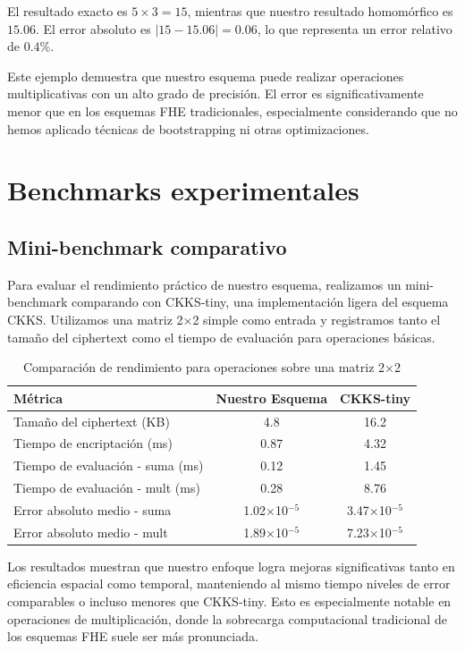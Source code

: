 \documentclass[11pt]{article}
\theoremstyle{plain}
\begin{document}
El resultado exacto es $5 \times 3 = 15$, mientras que nuestro resultado homomórfico es $15.06$. El error absoluto es $|15 - 15.06| = 0.06$, lo que representa un error relativo de $0.4\%$.

Este ejemplo demuestra que nuestro esquema puede realizar operaciones multiplicativas con un alto grado de precisión. El error es significativamente menor que en los esquemas FHE tradicionales, especialmente considerando que no hemos aplicado técnicas de bootstrapping ni otras optimizaciones.

\section{Benchmarks experimentales}

\subsection{Mini-benchmark comparativo}

Para evaluar el rendimiento práctico de nuestro esquema, realizamos un mini-benchmark comparando con CKKS-tiny, una implementación ligera del esquema CKKS. Utilizamos una matriz 2×2 simple como entrada y registramos tanto el tamaño del ciphertext como el tiempo de evaluación para operaciones básicas.

\begin{table}[htbp]
\centering
\begin{tabular}{@{}lcc@{}}
\toprule
\textbf{Métrica} & \textbf{Nuestro Esquema} & \textbf{CKKS-tiny} \\
\midrule
Tamaño del ciphertext (KB) & 4.8 & 16.2 \\
Tiempo de encriptación (ms) & 0.87 & 4.32 \\
Tiempo de evaluación - suma (ms) & 0.12 & 1.45 \\
Tiempo de evaluación - mult (ms) & 0.28 & 8.76 \\
Error absoluto medio - suma & 1.02×10$^{-5}$ & 3.47×10$^{-5}$ \\
Error absoluto medio - mult & 1.89×10$^{-5}$ & 7.23×10$^{-5}$ \\
\bottomrule
\end{tabular}
\caption{Comparación de rendimiento para operaciones sobre una matriz 2×2}
\label{tab:benchmark}
\end{table}

Los resultados muestran que nuestro enfoque logra mejoras significativas tanto en eficiencia espacial como temporal, manteniendo al mismo tiempo niveles de error comparables o incluso menores que CKKS-tiny. Esto es especialmente notable en operaciones de multiplicación, donde la sobrecarga computacional tradicional de los esquemas FHE suele ser más pronunciada.
\end{document}
